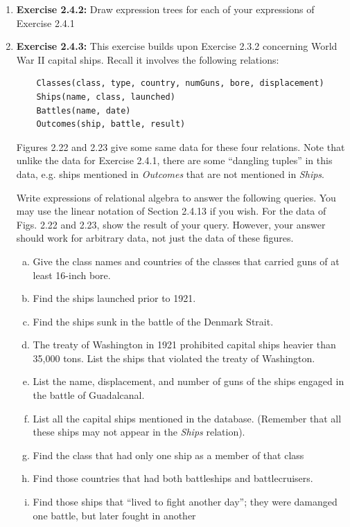 \documentclass[12pt]{article}
\begin{document}
\begin{enumerate}[1.]
    \item \textbf{Exercise 2.4.2:} Draw expression trees for each of your expressions
    of Exercise 2.4.1

    \item \textbf{Exercise 2.4.3:} This exercise builds upon Exercise 2.3.2 concerning
    World War II capital ships. Recall it involves the following relations:

    \begin{lstlisting}
    Classes(class, type, country, numGuns, bore, displacement)
    Ships(name, class, launched)
    Battles(name, date)
    Outcomes(ship, battle, result)
    \end{lstlisting}

    Figures 2.22 and 2.23 give some same data for these four relations. Note that unlike
    the data for Exercise 2.4.1, there are some ``dangling tuples'' in this data,
    e.g. ships mentioned in \textit{Outcomes} that are not mentioned in \textit{Ships}.

    \bigskip

    Write expressions of relational algebra to answer the following queries. You
    may use the linear notation of Section 2.4.13 if you wish. For the data of Figs.
    2.22 and 2.23, show the result of your query. However, your answer should work
    for arbitrary data, not just the data of these figures.

    \bigskip

    \begin{enumerate}[a)]
        \item Give the class names and countries of the classes that carried guns
        of at least 16-inch bore.
        \item Find the ships launched prior to 1921.
        \item Find the ships sunk in the battle of the Denmark Strait.
        \item The treaty of Washington in 1921 prohibited capital ships heavier than
        35,000 tons. List the ships that violated the treaty of Washington.
        \item List the name, displacement, and number of guns of the ships engaged
        in the battle of Guadalcanal.
        \item List all the capital ships mentioned in the database. (Remember that all
        these ships may not appear in the \textit{Ships} relation).
        \item Find the class that had only one ship as a member of that class
        \item Find those countries that had both battleships and battlecruisers.
        \item Find those ships that ``lived to fight another day''; they were damanged
        one battle, but later fought in another
    \end{enumerate}


\end{enumerate}
\end{document}
